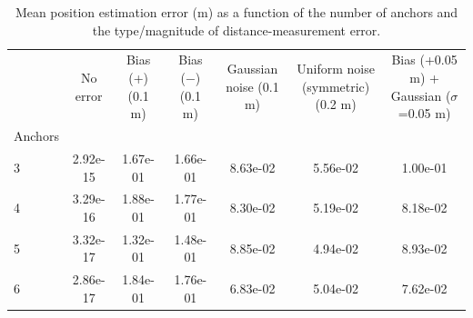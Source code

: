 \begin{table}
\caption{Mean position estimation error (m) as a function of the number of anchors and the type/magnitude of distance-measurement error.}
\label{tab:error_summary}
\begin{tabular}{lcccccc}
\toprule
 & No error & Bias (+) (0.1 m) & Bias (−) (0.1 m) & Gaussian noise (0.1 m) & Uniform noise (symmetric) (0.2 m) & Bias (+0.05 m) + Gaussian ($\sigma$=0.05 m) \\
Anchors &  &  &  &  &  &  \\
\midrule
3 & 2.92e-15 & 1.67e-01 & 1.66e-01 & 8.63e-02 & 5.56e-02 & 1.00e-01 \\
4 & 3.29e-16 & 1.88e-01 & 1.77e-01 & 8.30e-02 & 5.19e-02 & 8.18e-02 \\
5 & 3.32e-17 & 1.32e-01 & 1.48e-01 & 8.85e-02 & 4.94e-02 & 8.93e-02 \\
6 & 2.86e-17 & 1.84e-01 & 1.76e-01 & 6.83e-02 & 5.04e-02 & 7.62e-02 \\
\bottomrule
\end{tabular}
\end{table}
